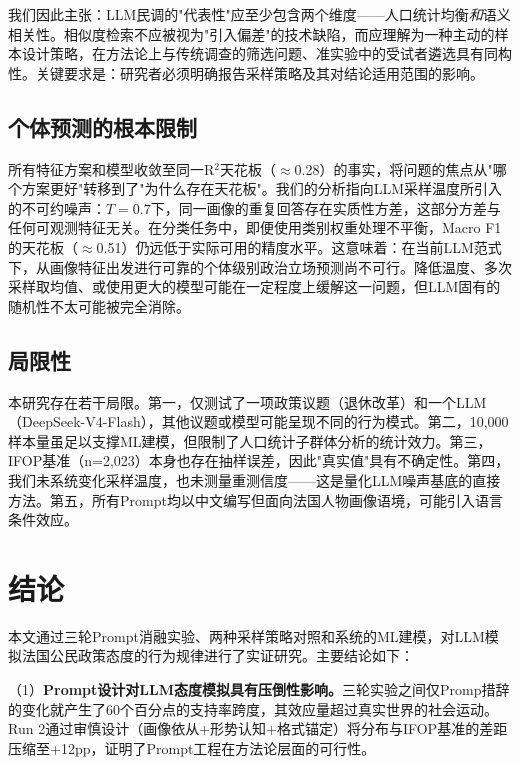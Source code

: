 \documentclass[11pt,a4paper]{ctexart}
\begin{document}
我们因此主张：LLM民调的"代表性"应至少包含两个维度——人口统计均衡\textit{和}语义相关性。相似度检索不应被视为"引入偏差"的技术缺陷，而应理解为一种主动的样本设计策略，在方法论上与传统调查的筛选问题、准实验中的受试者遴选具有同构性。关键要求是：研究者必须明确报告采样策略及其对结论适用范围的影响。

\subsection{个体预测的根本限制}

所有特征方案和模型收敛至同一R$^2$天花板（$\approx$0.28）的事实，将问题的焦点从"哪个方案更好"转移到了"为什么存在天花板"。我们的分析指向LLM采样温度所引入的不可约噪声：$T=0.7$下，同一画像的重复回答存在实质性方差，这部分方差与任何可观测特征无关。在分类任务中，即便使用类别权重处理不平衡，Macro F1的天花板（$\approx$0.51）仍远低于实际可用的精度水平。这意味着：在当前LLM范式下，从画像特征出发进行可靠的个体级别政治立场预测尚不可行。降低温度、多次采样取均值、或使用更大的模型可能在一定程度上缓解这一问题，但LLM固有的随机性不太可能被完全消除。

\subsection{局限性}

本研究存在若干局限。第一，仅测试了一项政策议题（退休改革）和一个LLM（DeepSeek-V4-Flash），其他议题或模型可能呈现不同的行为模式。第二，10,000样本量虽足以支撑ML建模，但限制了人口统计子群体分析的统计效力。第三，IFOP基准（n=2,023）本身也存在抽样误差，因此"真实值"具有不确定性。第四，我们未系统变化采样温度，也未测量重测信度——这是量化LLM噪声基底的直接方法。第五，所有Prompt均以中文编写但面向法国人物画像语境，可能引入语言条件效应。

\section{结论}

本文通过三轮Prompt消融实验、两种采样策略对照和系统的ML建模，对LLM模拟法国公民政策态度的行为规律进行了实证研究。主要结论如下：

（1）\textbf{Prompt设计对LLM态度模拟具有压倒性影响。}三轮实验之间仅Promp措辞的变化就产生了60个百分点的支持率跨度，其效应量超过真实世界的社会运动。Run 2通过审慎设计（画像依从+形势认知+格式锚定）将分布与IFOP基准的差距压缩至+12pp，证明了Prompt工程在方法论层面的可行性。
\end{document}
